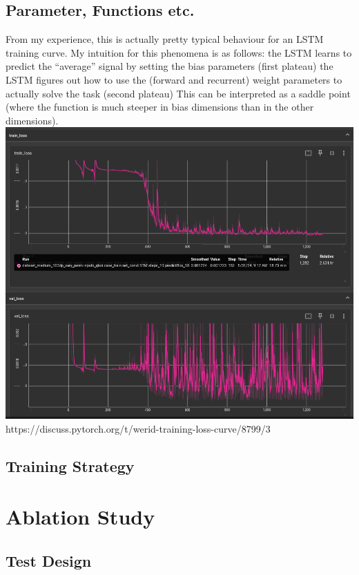 \documentclass[
  a4paper,  %
  twoside,  %
  bibliography=totoc,
  headsepline,
  cleardoublepage=empty,
  parskip=half,
  draft=false
]{scrbook}
\begin{document}
\section{Parameter, Functions etc.}
From my experience, this is actually pretty typical behaviour for an LSTM training curve. My intuition for this phenomena is as follows:
the LSTM learns to predict the “average” signal by setting the bias parameters (first plateau)
the LSTM figures out how to use the (forward and recurrent) weight parameters to actually solve the task (second plateau)
This can be interpreted as a saddle point (where the function is much steeper in bias dimensions than in the other dimensions).\newline
\includegraphics[width=\textwidth]{graphics/fluctuating_val_loss.png}
https://discuss.pytorch.org/t/werid-training-loss-curve/8799/3
\section{Training Strategy}

\chapter{Ablation Study}
\section{Test Design}
\end{document}
